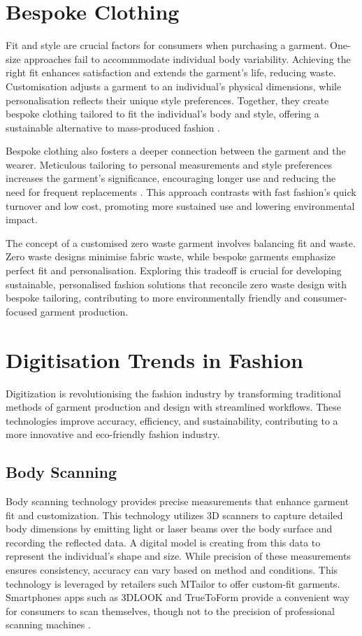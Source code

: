 \section{Bespoke Clothing}
Fit and style are crucial factors for consumers when purchasing a garment. One-size approaches fail to accommmodate individual body variability. Achieving the right fit enhances satisfaction and extends the garment's life, reducing waste. Customisation adjusts a garment to an individual's physical dimensions, while personalisation reflects their unique style preferences. Together, they create bespoke clothing tailored to fit the individual's body and style, offering a sustainable alternative to mass-produced fashion .

Bespoke clothing also fosters a deeper connection between the garment and the wearer. Meticulous tailoring to personal measurements and style preferences increases the garment's significance, encouraging longer use and reducing the need for frequent replacements \cite{almond_bespoke_2011}. This approach contrasts with fast fashion's quick turnover and low cost, promoting more sustained use and lowering environmental impact.

The concept of a customised zero waste garment involves balancing fit and waste. Zero waste designs minimise fabric waste, while bespoke garments emphasize perfect fit and personalisation. Exploring this tradeoff is crucial for developing sustainable, personalised fashion solutions that reconcile zero waste design with bespoke tailoring, contributing to more environmentally friendly and consumer-focused garment production.

\section{Digitisation Trends in Fashion}
Digitization is revolutionising the fashion industry by transforming traditional methods of garment production and design with streamlined workflows. These technologies improve accuracy, efficiency, and sustainability, contributing to a more innovative and eco-friendly fashion industry.

\subsection{Body Scanning}
Body scanning technology provides precise measurements that enhance garment fit and customization. This technology utilizes 3D scanners to capture detailed body dimensions by emitting light or laser beams over the body surface and recording the reflected data. A digital model is creating from this data to represent the individual's shape and size. While precision of these measurements ensures consistency, accuracy can vary based on method and conditions. This technology is leveraged by retailers such MTailor to offer custom-fit garments. Smartphones apps such as 3DLOOK and TrueToForm provide a convenient way for consumers to scan themselves, though not to the precision of professional scanning machines \cite{dapuzzo_3d_2007,dapuzzo_recent_2009,noauthor_truetoform_nodate,noauthor_technology_nodate,charter_accelerating_2024,gill_evolving_2023}.

